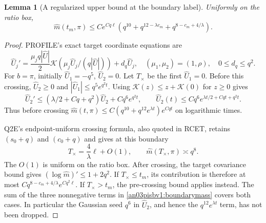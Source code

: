 \documentclass[11pt]{article}
\numberwithin{equation}{section}
\newtheorem{lemma}[theorem]{Lemma}
\theoremstyle{remark}\newtheorem{remark}[theorem]{Remark}
\newcommand{\Kh}{\mathcal K}
\begin{document}
\begin{lemma}[A regularized upper bound at the boundary label]
\label{an03pisbv1:boundary}
Uniformly on the ratio box,
\begin{equation}
 \widehat m(t_m,\pi)
 \le C e^{Cq\ell}
   \left(q^{10}+q^{12-\lambda c_m}
                  +q^{8-c_m+4/\lambda}\right).
 \label{an03pisbv1:boundarymass}
\end{equation}
\end{lemma}
\begin{proof}
PROFILE's exact target coordinate equations are
\[
 \widehat U_j'
  =\frac{\mu_jq|\widehat U|}{2}
       \Kh(\mu_j\widehat U_j/(q|\widehat U|))+d_q\widehat U_j,
 \quad (\mu_1,\mu_2)=(1,\rho),\quad 0\le d_q\le q^2.
\]
For $b=\pi$, initially $\widehat U_1=-q^5$, $\widehat U_2=0$.
Let $T_\times$ be the first $\widehat U_1=0$.
Before this crossing, $\widehat U_2\ge0$ and
$|\widehat U_1|\le q^5e^{q^2t}$.
Using $\Kh(z)\le z+\Kh(0)$ for $z\ge0$ gives
\[
 \widehat U_2'
 \le(\lambda/2+Cq+q^2)\widehat U_2+Cq^6e^{q^2t},
 \qquad
 \widehat U_2(t)\le Cq^6e^{\lambda t/2+Cqt+q^2t}.
\]
Thus before crossing
$\widehat m(t,\pi)\le C(q^{10}+q^{12}e^{\lambda t})e^{Cqt}$
on logarithmic times.

Q2E's endpoint-uniform crossing formula, also quoted in RCET,
retains $(s_0+q)$ and $(c_0+q)$ and gives at this boundary
\[
 T_\times=\frac4\lambda\ell+O(1),\qquad
 \widehat m(T_\times,\pi)\asymp q^8 .
\]
The $O(1)$ is uniform on the ratio box.
After crossing, the target covariance bound gives
$(\log\widehat m)'\le1+2q^2$.
If $T_\times\le t_m$, its contribution is therefore at most
$Cq^{8-c_m+4/\lambda}e^{Cq^2\ell}$.
If $T_\times>t_m$, the pre-crossing bound applies instead.
The sum of the three nonnegative terms in
\eqref{an03pisbv1:boundarymass} covers both cases.
In particular the Gaussian seed $q^6$ in $\widehat U_2$, and
hence the $q^{12}e^{\lambda t}$ term, has not been dropped.
\end{proof}
\end{document}
